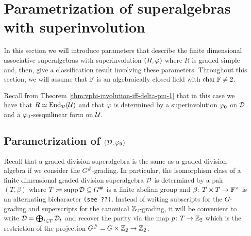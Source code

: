 

\section{Parametrization of superalgebras with superinvolution}

In this section we will introduce parameters that describe the finite dimensional associative superalgebras with superinvolution $(R, \varphi)$ where $R$ is graded simple and, then, give a classification result involving these parameters. 
Throughout this section, we will assume that $\mathbb{F}$ is an algebraically closed field with $\operatorname{char} \mathbb{F} \neq 2$.

Recall from Theorem \ref{thm:vphi-involution-iff-delta-pm-1} that in this case we have that $R \simeq \operatorname{End}_{\mathcal{D}} (\mathcal U)$ and that $\varphi$ is determined by a superinvolution $\varphi_0$ on $\mathcal{D}$ and a $\varphi_0$-sesquilinear form on $\mathcal U$.

\subsection{Parametrization of $(\mathcal{D}, \varphi_0)$}

Recall that a graded division superalgebra is the same as a graded division algebra if we consider the $G^\#$-grading. 
In particular, the isomorphism class of a finite dimensional graded division superalgebra $\mathcal{D}$ is determined by a pair $(T, \beta)$ where $T \coloneqq \operatorname{supp} \mathcal{D} \subseteq G^\#$ is a finite abelian group and $\beta\colon T\times T \to \mathbb{F}^\times$ is an alternating bicharacter {\tt (see ??)}. 
Instead of writing subscripts for the $G$-grading and superscripts for the canonical $\mathbb{Z}_2$-grading, it will be convenient to write $\mathcal{D} = \bigoplus_{t\in T} \mathcal{D}_t$ and recover the parity via the map $p\colon T \to \mathbb{Z}_2$ which is the restriction of the projection $G^\# = G\times \mathbb{Z}_2 \to \mathbb{Z}_2$. 


